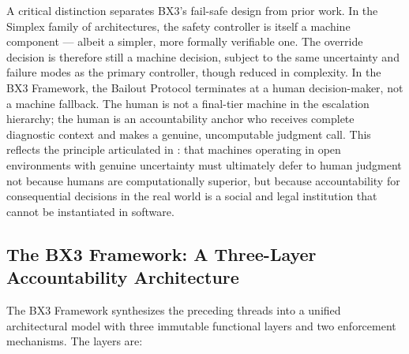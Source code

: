 A critical distinction separates BX3's fail-safe design from prior work. In the Simplex family of architectures, the safety controller is itself a machine component --- albeit a simpler, more formally verifiable one. The override decision is therefore still a machine decision, subject to the same uncertainty and failure modes as the primary controller, though reduced in complexity. In the BX3 Framework, the Bailout Protocol terminates at a human decision-maker, not a machine fallback. The human is not a final-tier machine in the escalation hierarchy; the human is an accountability anchor who receives complete diagnostic context and makes a genuine, uncomputable judgment call. This reflects the principle articulated in \cite{wiener1948}: that machines operating in open environments with genuine uncertainty must ultimately defer to human judgment not because humans are computationally superior, but because accountability for consequential decisions in the real world is a social and legal institution that cannot be instantiated in software.

\subsection{The BX3 Framework: A Three-Layer Accountability Architecture}

The BX3 Framework synthesizes the preceding threads into a unified architectural model with three immutable functional layers and two enforcement mechanisms. The layers are:

